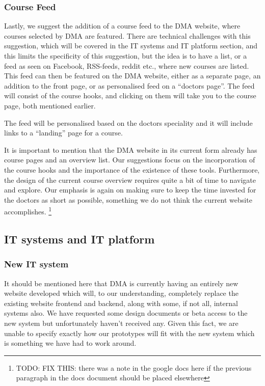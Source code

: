 \subsubsection{Course Feed}
Lastly, we suggest the addition of a course feed to the DMA website, where courses selected by DMA are featured. There are technical challenges with this suggestion, which will be covered in the IT systems and IT platform section, and this limits the specificity of this suggestion, but the idea is to have a list, or a feed as seen on Facebook, RSS-feeds, reddit etc., where new courses are listed. This feed can then be featured on the DMA website, either as a separate page, an addition to the front page, or as personalised feed on a “doctors page”. The feed will consist of the course hooks, and clicking on them will take you to the course page, both mentioned earlier.

The feed will be personalised based on the doctors speciality and it will include links to a “landing” page for a course.

It is important to mention that the DMA website in its current form already has course pages and an overview list. Our suggestions focus on the incorporation of the course hooks and the importance of the existence of these tools. Furthermore, the design of the current course overview requires quite a bit of time to navigate and explore. Our emphasis is again on making sure to keep the time invested for the doctors as short as possible, something we do not think the current website accomplishes.
\footnote{TODO: FIX THIS: there was a note in the google docs here if the previous paragraph in the docs document should be placed elsewhere}



\subsection{IT systems and IT platform}
\subsubsection{New IT system}
It should be mentioned here that DMA is currently having an entirely new website developed which will, to our understanding, completely replace the existing website frontend and backend, along with some, if not all, internal systems also. We have requested some design documents or beta access to the new system but unfortunately haven’t received any. Given this fact, we are unable to specify exactly how our prototypes will fit with the new system which is something we have had to work around.

